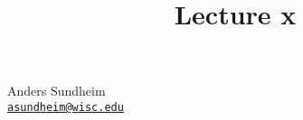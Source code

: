 \documentclass[12pt]{article}
\title{Lecture x}
\begin{document}
\maketitle
\vspace*{-0.25in}
\begin{center}
	Anders Sundheim \\
	\href{mailto:asundheim@wisc.edu}{{\tt asundheim@wisc.edu}}
\end{center}
\section{}
\subsection{}
\end{document}
